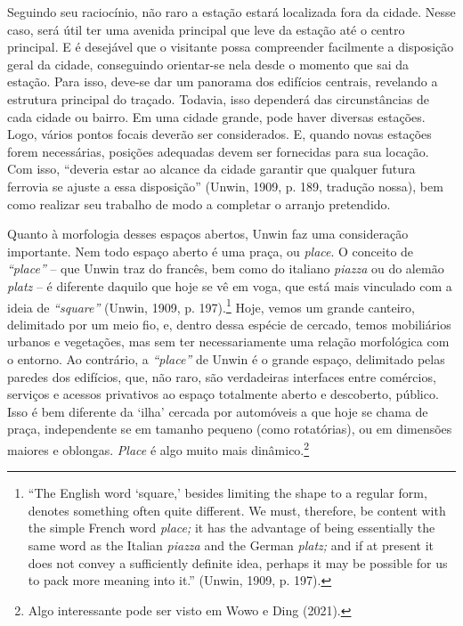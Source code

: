\documentclass[12pt, a4paper]{book} %
\begin{document}
        Seguindo seu raciocínio, não raro a estação estará localizada fora da cidade. Nesse caso, será útil ter uma avenida principal que leve da estação até o centro principal. E é desejável que o visitante possa compreender facilmente a disposição geral da cidade, conseguindo orientar-se nela desde o momento que sai da estação. Para isso, deve-se dar um panorama dos edifícios centrais, revelando a estrutura principal do traçado. Todavia, isso dependerá das circunstâncias de cada cidade ou bairro. Em uma cidade grande, pode haver diversas estações. Logo, vários pontos focais deverão ser considerados. E, quando novas estações forem necessárias, posições adequadas devem ser fornecidas para sua locação. Com isso, ``deveria estar ao alcance da cidade garantir que qualquer futura ferrovia se ajuste a essa disposição'' (Unwin, 1909, p. 189, tradução nossa), bem como realizar seu trabalho de modo a completar o arranjo pretendido.

        Quanto à morfologia desses espaços abertos, Unwin faz uma consideração importante. Nem todo espaço aberto é uma praça, ou \textit{place}. O conceito de \textit{``place''}  – que Unwin traz do francês, bem como do italiano \textit{piazza} ou do alemão \textit{platz} – é diferente daquilo que hoje se vê em voga, que está mais vinculado com a ideia de \textit{``square''} (Unwin, 1909, p. 197).\footnote[8]{``The English word `square,' besides limiting the shape to a regular form, denotes something often quite different. We must, therefore, be content with the simple French word \textit{place;} it has the advantage of being essentially the same word as the Italian \textit{piazza} and the German \textit{platz;} and if at present it does not convey a sufficiently definite idea, perhaps it may be possible for us to pack more meaning into it.'' (Unwin, 1909, p. 197).} Hoje, vemos um grande canteiro, delimitado por um meio fio, e, dentro dessa espécie de cercado, temos mobiliários urbanos e vegetações, mas sem ter necessariamente uma relação morfológica com o entorno. Ao contrário, a \textit{``place''} de Unwin é o grande espaço, delimitado pelas paredes dos edifícios, que, não raro, são verdadeiras interfaces entre comércios, serviços e acessos privativos ao espaço totalmente aberto e descoberto, público. Isso é bem diferente da `ilha' cercada por automóveis a que hoje se chama de praça, independente se em tamanho pequeno (como rotatórias), ou em dimensões maiores e oblongas. \textit{Place} é algo muito mais dinâmico.\footnote[9]{Algo interessante pode ser visto em Wowo e Ding (2021).}
\end{document}

